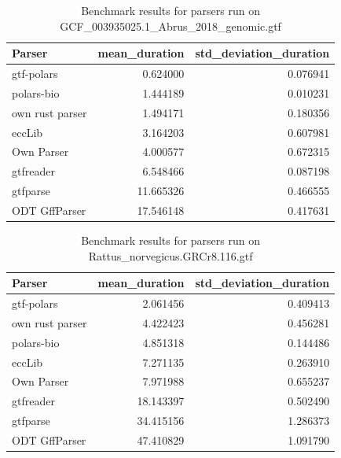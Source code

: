 \begin{table}
\caption{Benchmark results for parsers run on GCF\_003935025.1\_Abrus\_2018\_genomic.gtf}
\label{tab:benchmark-GCF_003935025.1_Abrus_2018_genomic.gtf}
\begin{tabular}{lrr}
\toprule
Parser & mean\_duration & std\_deviation\_duration \\
\midrule
gtf-polars & 0.624000 & 0.076941 \\
polars-bio & 1.444189 & 0.010231 \\
own rust parser & 1.494171 & 0.180356 \\
eccLib & 3.164203 & 0.607981 \\
Own Parser & 4.000577 & 0.672315 \\
gtfreader & 6.548466 & 0.087198 \\
gtfparse & 11.665326 & 0.466555 \\
ODT GffParser & 17.546148 & 0.417631 \\
\bottomrule
\end{tabular}
\end{table}

\begin{table}
\caption{Benchmark results for parsers run on Rattus\_norvegicus.GRCr8.116.gtf}
\label{tab:benchmark-Rattus_norvegicus.GRCr8.116.gtf}
\begin{tabular}{lrr}
\toprule
Parser & mean\_duration & std\_deviation\_duration \\
\midrule
gtf-polars & 2.061456 & 0.409413 \\
own rust parser & 4.422423 & 0.456281 \\
polars-bio & 4.851318 & 0.144486 \\
eccLib & 7.271135 & 0.263910 \\
Own Parser & 7.971988 & 0.655237 \\
gtfreader & 18.143397 & 0.502490 \\
gtfparse & 34.415156 & 1.286373 \\
ODT GffParser & 47.410829 & 1.091790 \\
\bottomrule
\end{tabular}
\end{table}

